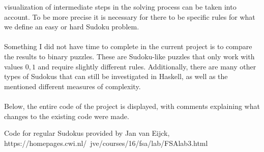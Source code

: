 \documentclass[12pt,a4paper]{article}
\begin{document}
visualization of intermediate steps in the solving process can be taken into account.
To be more precise it is necessary for there to be specific rules for what we define an easy or hard
Sudoku problem.\\\\
Something I did not have time to complete in the current project is to compare the
results to binary puzzles. These are Sudoku-like puzzles that only work with values
$0,1$ and require slightly different rules. Additionally, there are many other types
of Sudokus that can still be investigated in Haskell, as well as the mentioned different measures
of complexity.\\\\
Below, the entire code of the project is displayed, with comments explaining what
changes to the existing code were made.


\clearpage






Code for regular Sudokus provided by Jan van Eijck, https://homepages.cwi.nl/~jve/courses/16/fsa/lab/FSAlab3.html
\end{document}
